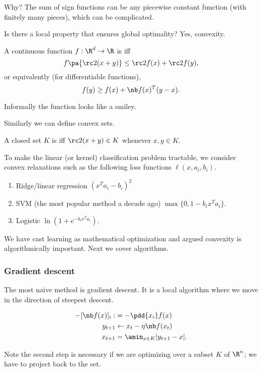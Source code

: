 Why? 
The sum of sign functions can be any piecewise constant function (with finitely many pieces), which can be complicated.

Is there a local property that ensures global optimality? Yes, convexity. 
\begin{df}
A continuous function $f:\R^d\to \R$ is  iff
$$
f\pa{\rc2 (x+y)} \le \rc 2 f(x) + \rc 2f(y),
$$
or equivalently (for differentiable functions),
$$
f(y) \ge f(x) + \nb f(x)^T(y-x).
$$
\end{df}
Informally the function looks like a smiley.

Similarly we can define convex sets.
\begin{df}
A closed set $K$ is  iff $\rc2(x+y)\in K$ whenever $x,y\in K$.
\end{df}


To make the linear (or kernel) classification problem tractable, we consider  convex relaxations such as the following loss functions $\ell(x,a_i,b_i)$.
\begin{enumerate}
\item
Ridge/linear regression $(x^Ta_i-b_i)^2$
\item
SVM (the most popular method a decade ago) $\max\{0,1-b_ix^Ta_i\}$.
\item
Logistic $\ln(1+e^{-b_i x^Ta_i})$.
\end{enumerate}

We have cast learning as mathematical optimization and argued convexity is algorithmically important. Next we cover algorithms.

\subsubsection{Gradient descent}

The most naive method is gradient descent. It is a local algorithm where we move in the direction of steepest descent. 
\begin{alg}
\begin{align}
-[\nb f(x)]_i :&= -\pdd{x_i} f(x)\\
y_{t+1} &\leftarrow x_t-\eta \nb f(x_t)\\
x_{t+1} &=\amin_{x\in K}|y_{t+1}-x|.
\end{align}
\end{alg}
Note the second step is necessary if we are optimizing over a subset $K$ of $\R^n$; we have to project back to the set.

